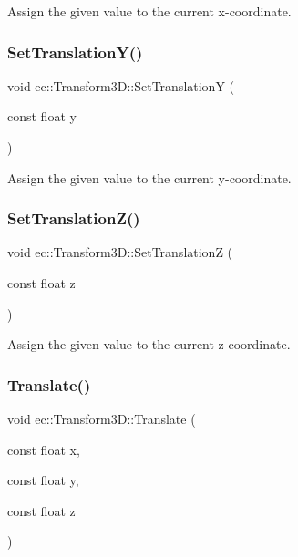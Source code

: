 Assign the given value to the current x-\/coordinate. \mbox{\label{classec_1_1_transform3_d_a93cbe1baa33972865b10554fbacfddec}} 
\subsubsection{\texorpdfstring{Set\+Translation\+Y()}{SetTranslationY()}}
{\footnotesize\ttfamily void ec\+::\+Transform3\+D\+::\+Set\+TranslationY (\begin{DoxyParamCaption}\item[{const float}]{y }\end{DoxyParamCaption})}

Assign the given value to the current y-\/coordinate. \mbox{\label{classec_1_1_transform3_d_af7a125c99afbd7e53cf7b905c2ab1db4}} 
\subsubsection{\texorpdfstring{Set\+Translation\+Z()}{SetTranslationZ()}}
{\footnotesize\ttfamily void ec\+::\+Transform3\+D\+::\+Set\+TranslationZ (\begin{DoxyParamCaption}\item[{const float}]{z }\end{DoxyParamCaption})}

Assign the given value to the current z-\/coordinate. \mbox{\label{classec_1_1_transform3_d_a553b6e61a45aae2661bcb5568613a32a}} 
\subsubsection{\texorpdfstring{Translate()}{Translate()}\hspace{0.1cm}{\footnotesize\ttfamily [1/2]}}
{\footnotesize\ttfamily void ec\+::\+Transform3\+D\+::\+Translate (\begin{DoxyParamCaption}\item[{const float}]{x,  }\item[{const float}]{y,  }\item[{const float}]{z }\end{DoxyParamCaption})}

